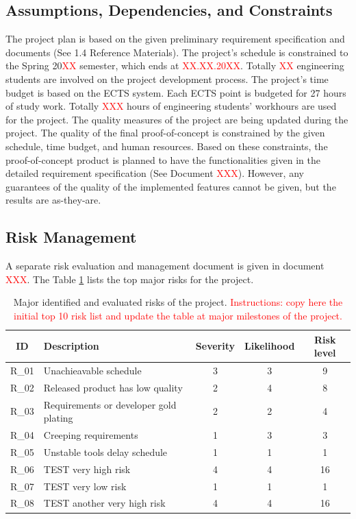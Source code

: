 \documentclass{article}
\begin{document}
\subsection{Assumptions, Dependencies, and Constraints}
The project plan is based on the given preliminary requirement specification and
documents (See 1.4 Reference Materials).
The project’s schedule is constrained to the Spring 20\textcolor{red}{XX} semester, which ends
at \textcolor{red}{XX.XX.20XX}. Totally \textcolor{red}{XX} engineering students are involved on the project
development process.
The project’s time budget is based on the ECTS system. Each ECTS point is
budgeted for 27 hours of study work. Totally \textcolor{red}{XXX} hours of engineering students’
workhours are used for the project.
The quality measures of the project are being updated during the project. The
quality of the final proof-of-concept is constrained by the given schedule, time
budget, and human resources. Based on these constraints, the proof-of-concept
product is planned to have the functionalities given in the detailed requirement
specification (See Document \textcolor{red}{XXX}). However, any guarantees of the quality of the
implemented features cannot be given, but the results are as-they-are.
\subsection{Risk Management}

A separate risk evaluation and management document is given in document \textcolor{red}{XXX}.
The Table \ref{tab:project_risks} lists the top major risks for the project.

\begin{table}[h]


\centering
\caption{Major identified and evaluated risks of the project. \textcolor{red} {Instructions: copy
here the initial top 10 risk list and update the table at major milestones of the
project. }}

\label{tab:project_risks}
\begin{tabular}{|c|l|c|c|c|}
\hline
\textbf{ID} & \textbf{Description} & \textbf{Severity} & \textbf{Likelihood} & \textbf{Risk level} \\
\hline
R\_01 & Unachieavable schedule & 3 & 3 & \cellcolor{yellow} 9 \\
\hline
R\_02 & Released product has low quality & 2 & 4 & \cellcolor{yellow} 8 \\
\hline
R\_03 & Requirements or developer gold plating & 2 & 2 & \cellcolor{lightgreen} 4 \\
\hline
R\_04 & Creeping requirements & 1 & 3 & \cellcolor{lightgreen} 3 \\
\hline
R\_05 & Unstable tools delay schedule & 1 & 1 & \cellcolor{green} 1 \\
\hline
R\_06 & TEST very high risk & 4 & 4 & \cellcolor{red} 16 \\
\hline
R\_07 & TEST very low risk & 1 & 1 & \cellcolor{green}  1 \\
\hline
R\_08 & TEST another very high risk & 4 & 4 & \cellcolor{red} 16 \\
\hline
\end{tabular}
\end{table}
\end{document}
